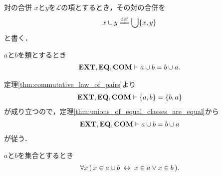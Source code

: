 	\begin{itembox}[l]{対の合併}
		$x$と$y$を$\mathcal{L}$の項とするとき，その対の合併を
		\begin{align}
			x \cup y \defeq \bigcup \{x,y\}
		\end{align}
		と書く．
	\end{itembox}
	
	\begin{screen}
		\begin{thm}[対の合併の可換律]
			$a$と$b$を類とするとき
			\begin{align}
				\mbox{{\bf EXT}},\mbox{{\bf EQ}},\mbox{\bf COM} \vdash a \cup b = b \cup a.
			\end{align}
		\end{thm}
	\end{screen}
	
	\begin{sketch}
		定理\ref{thm:commutative_law_of_pairs}より
		\begin{align}
			\mbox{{\bf EXT}},\mbox{{\bf EQ}},\mbox{\bf COM} \vdash \{a,b\} = \{b,a\}
		\end{align}
		が成り立つので，定理\ref{thm:unions_of_equal_classes_are_equal}から
		\begin{align}
			\mbox{{\bf EXT}},\mbox{{\bf EQ}},\mbox{\bf COM} \vdash a \cup b = b \cup a
		\end{align}
		が従う．
		\QED
	\end{sketch}
	
	\begin{screen}
		\begin{thm}[対の合併はそれぞれの要素を合わせたもの]
		\label{thm:union_of_pair_is_union_of_their_elements}
			$a$と$b$を集合とするとき
			\begin{align}
				\forall x\, (\, x \in a \cup b \hspace{0.25em}\leftrightarrow\hspace{0.25em} x \in a \vee x \in b\, ).
			\end{align}
		\end{thm}
	\end{screen}
	
	
